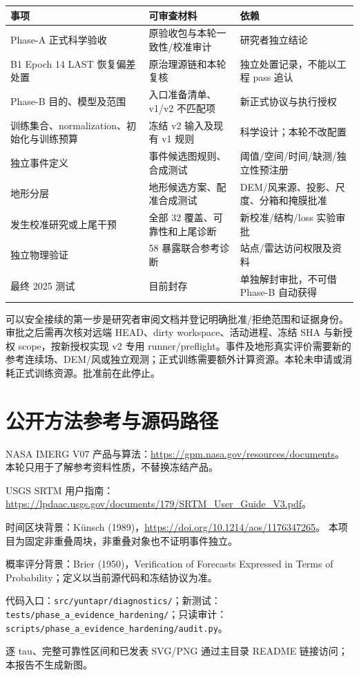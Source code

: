 \documentclass[UTF8,a4paper,10pt,fontset=fandol]{ctexart}
\begin{document}
\begin{center}\scriptsize\begin{longtable}{@{}p{}p{}p{}@{}}\toprule
事项 & 可审查材料 & 依赖\\
\midrule\endhead
Phase-A 正式科学验收 & 原验收包与本轮一致性/校准审计 & 研究者独立结论\\
B1 Epoch 14 LAST 恢复偏差处置 & 原治理源链和本轮复核 & 独立处置记录，不能以工程 pass 追认\\
Phase-B 目的、模型及范围 & 入口准备清单、v1/v2 不匹配项 & 新正式协议与执行授权\\
训练集合、normalization、初始化与训练预算 & 冻结 v2 输入及现有 v1 规则 & 科学设计；本轮不改配置\\
独立事件定义 & 事件候选图规则、合成测试 & 阈值/空间/时间/缺测/独立性预注册\\
地形分层 & 地形候选方案、配准合成测试 & DEM/风来源、投影、尺度、分箱和掩膜批准\\
发生校准研究或上尾干预 & 全部 32 覆盖、可靠性和上尾诊断 & 新校准/结构/loss 实验审批\\
独立物理验证 & 58 暴露联合参考诊断 & 站点/雷达访问权限及资料\\
最终 2025 测试 & 目前封存 & 单独解封审批，不可借 Phase-B 自动获得\\
\bottomrule\end{longtable}\end{center}\normalsize

可以安全接续的第一步是研究者审阅文档并登记明确批准/拒绝范围和证据身份。审批之后需再次核对远端 HEAD、dirty workspace、活动进程、冻结 SHA 与新授权 scope，按新授权实现 v2 专用 runner/preflight。事件及地形真实评价需要新的参考连续场、DEM/风或独立观测；正式训练需要额外计算资源。本轮未申请或消耗正式训练资源。批准前在此停止。\par\clearpage\section*{公开方法参考与源码路径}
NASA IMERG V07 产品与算法：\url{https://gpm.nasa.gov/resources/documents}。
本轮只用于了解参考资料性质，不替换冻结产品。
\par USGS SRTM 用户指南：\url{https://lpdaac.usgs.gov/documents/179/SRTM_User_Guide_V3.pdf}。
\par 时间区块背景：K\"unsch (1989)，\url{https://doi.org/10.1214/aos/1176347265}。
本项目为固定非重叠周块，非重叠对象也不证明事件独立。
\par 概率评分背景：Brier (1950)，Verification of Forecasts Expressed in Terms of Probability；定义以当前源代码和冻结协议为准。
\par 代码入口：\texttt{src/yuntapr/diagnostics/}；新测试：\texttt{tests/phase\_a\_evidence\_hardening/}；只读审计：\texttt{scripts/phase\_a\_evidence\_hardening/audit.py}。
\par 逐 tau、完整可靠性区间和已发表 SVG/PNG 通过主目录 README 链接访问；本报告不生成新图。
\end{document}
